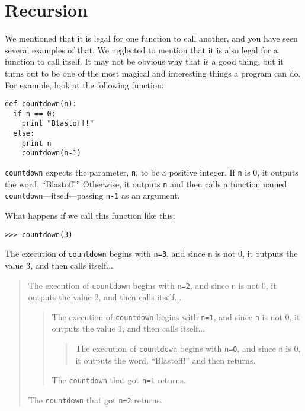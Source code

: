\section{Recursion}
\label{recursion}

We mentioned that it is legal for one function to call another, and
you have seen several examples of that.  We neglected to mention that
it is also legal for a function to call itself.  It may not be obvious
why that is a good thing, but it turns out to be one of the most
magical and interesting things a program can do.
For example, look at the following function:

\beforeverb
\begin{verbatim}
def countdown(n):
  if n == 0:
    print "Blastoff!"
  else:
    print n
    countdown(n-1)
\end{verbatim}
\afterverb
%
{\tt countdown} expects the parameter, {\tt n}, to be a positive
integer.  If {\tt n} is 0, it outputs the word, ``Blastoff!''
Otherwise, it outputs {\tt n} and then calls a function named
{\tt countdown}---itself---passing {\tt n-1} as an argument.

What happens if we call this function like this:

\beforeverb
\begin{verbatim}
>>> countdown(3)
\end{verbatim}
\afterverb
%
The execution of {\tt countdown} begins with {\tt n=3}, and since
{\tt n} is not 0, it outputs the value 3, and then calls itself...

\begin{quote}
The execution of {\tt countdown} begins with {\tt n=2}, and since
{\tt n} is not 0, it outputs the value 2, and then calls itself...

\begin{quote}
The execution of {\tt countdown} begins with {\tt n=1}, and since
{\tt n} is not 0, it outputs the value 1, and then calls itself...

\begin{quote}
The execution of {\tt countdown} begins with {\tt n=0}, and since
{\tt n} is 0, it outputs the word, ``Blastoff!'' and then returns.
\end{quote}

The {\tt countdown} that got {\tt n=1} returns.
\end{quote}

The {\tt countdown} that got {\tt n=2} returns.
\end{quote}

